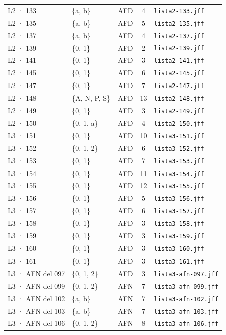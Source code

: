 \begin{longtable}[]{@{}lllcl@{}}
L2 · 133 & \{a, b\} & AFD & 4 & \texttt{lista2-133.jff} \\
L2 · 135 & \{a, b\} & AFD & 5 & \texttt{lista2-135.jff} \\
L2 · 137 & \{a, b\} & AFD & 4 & \texttt{lista2-137.jff} \\
L2 · 139 & \{0, 1\} & AFD & 2 & \texttt{lista2-139.jff} \\
L2 · 141 & \{0, 1\} & AFD & 3 & \texttt{lista2-141.jff} \\
L2 · 145 & \{0, 1\} & AFD & 6 & \texttt{lista2-145.jff} \\
L2 · 147 & \{0, 1\} & AFD & 7 & \texttt{lista2-147.jff} \\
L2 · 148 & \{A, N, P, S\} & AFD & 13 & \texttt{lista2-148.jff} \\
L2 · 149 & \{0, 1\} & AFD & 3 & \texttt{lista2-149.jff} \\
L2 · 150 & \{0, 1, a\} & AFD & 4 & \texttt{lista2-150.jff} \\
L3 · 151 & \{0, 1\} & AFD & 10 & \texttt{lista3-151.jff} \\
L3 · 152 & \{0, 1, 2\} & AFD & 6 & \texttt{lista3-152.jff} \\
L3 · 153 & \{0, 1\} & AFD & 7 & \texttt{lista3-153.jff} \\
L3 · 154 & \{0, 1\} & AFD & 11 & \texttt{lista3-154.jff} \\
L3 · 155 & \{0, 1\} & AFD & 12 & \texttt{lista3-155.jff} \\
L3 · 156 & \{0, 1\} & AFD & 5 & \texttt{lista3-156.jff} \\
L3 · 157 & \{0, 1\} & AFD & 6 & \texttt{lista3-157.jff} \\
L3 · 158 & \{0, 1\} & AFD & 3 & \texttt{lista3-158.jff} \\
L3 · 159 & \{0, 1\} & AFD & 3 & \texttt{lista3-159.jff} \\
L3 · 160 & \{0, 1\} & AFD & 3 & \texttt{lista3-160.jff} \\
L3 · 161 & \{0, 1\} & AFD & 3 & \texttt{lista3-161.jff} \\
L3 · AFN del 097 & \{0, 1, 2\} & AFD & 3 & \texttt{lista3-afn-097.jff} \\
L3 · AFN del 099 & \{0, 1, 2\} & AFN & 7 & \texttt{lista3-afn-099.jff} \\
L3 · AFN del 102 & \{a, b\} & AFN & 7 & \texttt{lista3-afn-102.jff} \\
L3 · AFN del 103 & \{a, b\} & AFN & 7 & \texttt{lista3-afn-103.jff} \\
L3 · AFN del 106 & \{0, 1, 2\} & AFN & 8 & \texttt{lista3-afn-106.jff} \\

\end{longtable}
